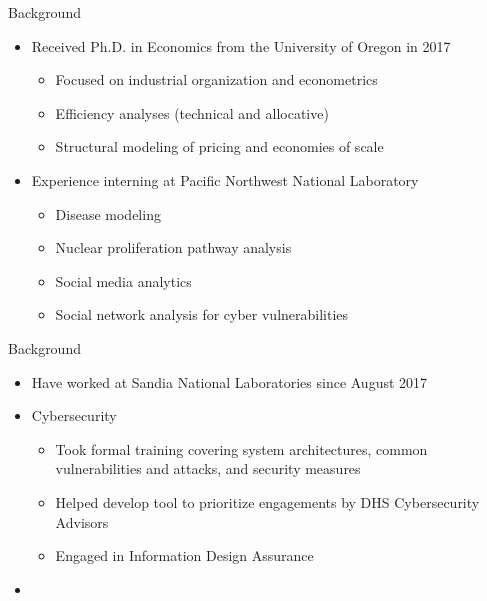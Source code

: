 \documentclass{beamer}
\begin{document}
	
\begin{frame}{Background}
\begin{itemize}
	\item Received Ph.D. in Economics from the University of Oregon in 2017
		\begin{itemize}
			\item Focused on industrial organization and econometrics
			\item Efficiency analyses (technical and allocative)
			\item Structural modeling of pricing and economies of scale
		\end{itemize}
	\item Experience interning at Pacific Northwest National Laboratory
		\begin{itemize}
			\item Disease modeling
			\item Nuclear proliferation pathway analysis
			\item Social media analytics
			\item Social network analysis for cyber vulnerabilities
		\end{itemize}
\end{itemize}
\end{frame}

\begin{frame}{Background}
\begin{itemize}
	\item Have worked at Sandia National Laboratories since August 2017
	\item Cybersecurity
		\begin{itemize}
			\item Took formal training covering system architectures, common vulnerabilities and attacks, and security measures
			\item Helped develop tool to prioritize engagements by DHS Cybersecurity Advisors
			\item Engaged in Information Design Assurance 
		\end{itemize}
\end{itemize}
\end{frame}

\begin{frame}
\begin{itemize}
	\item 
\end{itemize}
\end{frame}
\end{document}
